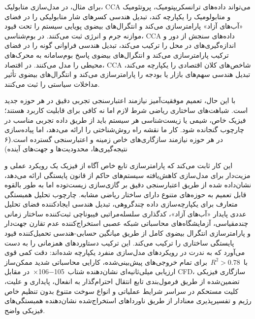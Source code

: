 \documentclass[12pt, a4paper]{article}
\begin{document}
برای مثال، در مدل‌سازی متابولیک، CCA می‌تواند داده‌های ترانسکریپتومیک، پروتئومیک و متابولومیک را یکپارچه کند، تبدیل هندسی کسرهای شار متابولیکی را در فضای «آب‌های آزاد» پارامترسازی می‌کند و انتگرال‌های بیضوی پویایی سیستم را تحت قیود موازنه جرم و انرژی ثبت می‌کنند. در بوم‌شناسی، CCA داده‌های سنجش از دور و اندازه‌گیری‌های در محل را ترکیب می‌کند، تبدیل هندسی فراوانی گونه را در فضای ترکیب پارامترسازی می‌کند و انتگرال‌های بیضوی پاسخ بوم‌سامانه به محرک‌های محیطی را مدل می‌کنند. در اقتصاد، CCA شاخص‌های کلان اقتصادی را یکپارچه می‌کند، تبدیل هندسی سهم‌های بازار یا بودجه را پارامترسازی می‌کند و انتگرال‌های بیضوی تأثیر مداخلات سیاستی را ثبت می‌کنند.

با این حال، تعمیم موفقیت‌آمیز نیازمند اعتبارسنجی تجربی دقیق در هر حوزه جدید است. شباهت‌های ساختاری ریاضی شرط لازم اما نه کافی برای قابلیت کاربرد هستند؛ فیزیک خاص، شیمی یا زیست‌شناسی هر سیستم باید از طریق داده تجربی مناسب در چارچوب گنجانده شود. کار ما نقشه راه روش‌شناختی را ارائه می‌دهد، اما پیاده‌سازی در هر حوزه نیازمند سازگاری‌های خاص زمینه و اعتبارسنجی گسترده است.\textbf(۶ نتیجه‌گیری‌ها، محدودیت‌ها و جهت‌های آینده)

این کار ثابت می‌کند که پارامترسازی تابع خاص آگاه از فیزیک یک رویکرد عملی و مزیت‌دار برای مدل‌سازی کاهش‌یافته سیستم‌های حاکم از قانون پایستگی ارائه می‌دهد، نشان‌داده شده از طریق اعتبارسنجی دقیق بر گازی‌سازی زیست‌توده اما به طور بالقوه قابل تعمیم به حوزه‌های متنوع دارای ساختار ریاضی مشابه. چارچوب تحلیل همبستگی متعارف برای یکپارچه‌سازی داده چندگروهی، تبدیل هندسی ایجادکننده فضای تحلیل عددی پایدار «آب‌های آزاد»، کدگذاری سلسله‌مراتبی فیبوناچی ثبت‌کننده ساختار زمانی چندمقیاسی، آزمایشگاه‌های محاسباتی شبکه عصبی استخراج‌کننده عدم تقارن جهت‌دار و پارامترسازی انتگرال بیضوی کامل از طریق میانگین حسابی-هندسی تحمیل‌کننده قیود پایستگی ساختاری را ترکیب می‌کند. این ترکیب دستاوردهای همزمانی را به دست می‌آورد که به ندرت در رویکردهای مدل‌سازی منفرد یکپارچه شده‌اند: دقت کمی قوی با $R^{2}>0.78$ برای تمام خروجی‌های پیش‌بینی‌شده، کارایی محاسباتی شدید ممکن‌ساز ارزیابی میلی‌ثانیه‌ای نشان‌دهنده شتاب 105−106× در مقابل CFD، سازگاری فیزیکی تضمین‌شده از طریق فرمول‌بندی تابع انتقال احترام‌گذار به انفعال، پایداری و علیت، کلیت مستحکم در سراسر شرایط عملیاتی و انواع سوخت متنوع بدون تنظیم خاص رژیم و تفسیرپذیری معنادار از طریق ناورداهای استخراج‌شده نشان‌دهنده همبستگی‌های فیزیکی واضح.
\end{document}

